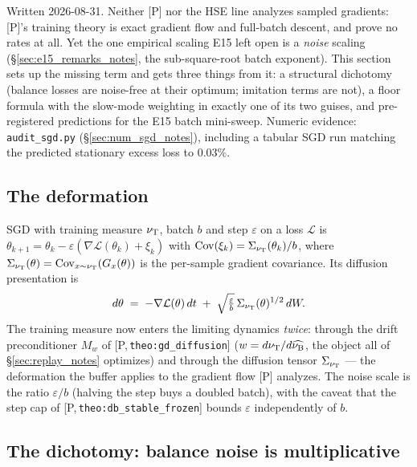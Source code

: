 \documentclass[11pt]{article}
\theoremstyle{definition}
\theoremstyle{remark}
\def\lambda{\widehat\nuB}
\newcommand{\paperref}[1]{[P,\,\texttt{#1}]}   %
\begin{document}
Written 2026-08-31. Neither [P] nor the HSE line analyzes sampled gradients: [P]'s
training theory is exact gradient flow and full-batch descent, and
\citet{morozov2025revisiting} prove no rates at all. Yet the one empirical scaling E15
left open is a \emph{noise} scaling (\S\ref{sec:e15_remarks_notes}, the sub-square-root batch
exponent). This section sets up the missing term and gets three things from it: a
structural dichotomy (balance losses are noise-free at their optimum; imitation terms are
not), a floor formula with the slow-mode weighting in exactly one of its two guises, and
pre-registered predictions for the E15 batch mini-sweep. Numeric evidence:
\texttt{audit\_sgd.py} (\S\ref{sec:num_sgd_notes}), including a tabular SGD run matching the
predicted stationary excess loss to $0.03\%$.

\subsection{The deformation}\label{sec:deformation_notes}

SGD with training measure $\nu_{\mathrm{T}}$, batch $b$ and step $\varepsilon$ on a loss
$\mathcal L$ is $\theta_{k+1} = \theta_k - \varepsilon(\nabla\mathcal L(\theta_k)+\xi_k)$
with $\mathrm{Cov}(\xi_k) = \Sigma_{\nu_{\mathrm{T}}}(\theta_k)/b$, where
$\Sigma_{\nu_{\mathrm{T}}}(\theta) = \mathrm{Cov}_{x\sim\nu_{\mathrm{T}}}(G_x(\theta))$ is the
per-sample gradient covariance. Its diffusion presentation \citep{li2019sme} is
\begin{equation}\label{equ:sme_notes}
    d\theta \;=\; -\nabla\mathcal L(\theta)\,dt
    \;+\; \sqrt{\tfrac{\varepsilon}{b}}\,\Sigma_{\nu_{\mathrm{T}}}(\theta)^{1/2}\,dW .
\end{equation}
The training measure now enters the limiting dynamics \emph{twice}: through the drift
preconditioner $M_w$ of \paperref{theo:gd\_diffusion} ($w = d\nutrain/d\lambda$, the
object all of \S\ref{sec:replay_notes} optimizes) and through the diffusion tensor
$\Sigma_{\nu_{\mathrm{T}}}$ --- the deformation the buffer applies to the gradient flow [P]
analyzes. The noise scale is the ratio $\varepsilon/b$ (halving the step buys a doubled
batch), with the caveat that the step cap of \paperref{theo:db\_stable\_frozen} bounds
$\varepsilon$ independently of $b$.

\subsection{The dichotomy: balance noise is multiplicative}\label{sec:dichotomy_notes}
\end{document}
